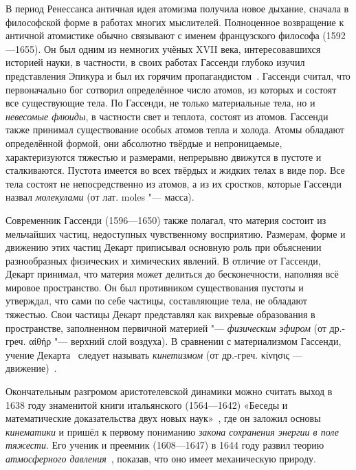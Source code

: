 \documentclass[a4paper, 12pt, oneside]{article} %
\begin{document}
В период Ренессанса античная идея атомизма получила новое дыхание,
сначала в философской форме в работах многих мыслителей. Полноценное
возвращение к античной атомистике обычно связывают с именем французского
философа  (1592---1655). Он был одним из немногих
учёных XVII века, интересовавшихся историей науки, в частности, в своих
работах Гассенди глубоко изучил представления Эпикура и был их горячим
пропагандистом~\cite{gassendi1966writings}. Гассенди считал, что
первоначально бог сотворил определённое число атомов, из которых и
состоят все существующие тела. По Гассенди, не только материальные тела,
но и \emph{невесомые флюиды}, в частности свет и теплота, состоят из
атомов. Гассенди также принимал существование особых атомов тепла и
холода. Атомы обладают определённой формой, они абсолютно твёрдые и
непроницаемые, характеризуются тяжестью и размерами, непрерывно движутся
в пустоте и сталкиваются. Пустота имеется во всех твёрдых и жидких телах
в виде пор. Все тела состоят не непосредственно из атомов, а из их
сростков, которые Гассенди назвал \emph{молекулами} (от лат. moles "---
масса).

Современник Гассенди  (1596---1650) также полагал,
что материя состоит из мельчайших частиц, недоступных чувственному
восприятию. Размерам, форме и движению этих частиц Декарт приписывал
основную роль при объяснении разнообразных физических и химических
явлений. В отличие от Гассенди, Декарт принимал, что материя может
делиться до бесконечности, наполняя всё мировое пространство. Он был
противником существования пустоты и утверждал, что сами по себе частицы,
составляющие тела, не обладают тяжестью. Свои частицы Декарт представлял
как вихревые образования в пространстве, заполненном первичной материей
"--- \emph{физическим эфиром} (от др.-греч.
\foreignlanguage{greek}{αἰθήρ} "--- верхний слой воздуха). В сравнении с
материализмом Гассенди, учение Декарта~\cite{descartes1950selected}
следует называть \emph{кинетизмом} (от др.-греч.
\foreignlanguage{greek}{κίνησις} ---
движение)~\cite{kaydakov1998theological}.

Окончательным разгромом аристотелевской динамики можно считать выход в
1638 году знаменитой книги итальянского 
(1564---1642) «Беседы и математические доказательства двух новых
наук»~\cite{galileo1964discussions}, где он заложил основы
\emph{кинематики} и пришёл к первому пониманию \emph{закона сохранения
энергии в поле тяжести}. Его ученик и преемник  (1608---1647) в 1644 году развил теорию \emph{атмосферного
давления}~\cite{torricelli1644opera}, показав, что оно имеет
механическую природу.
\end{document}
